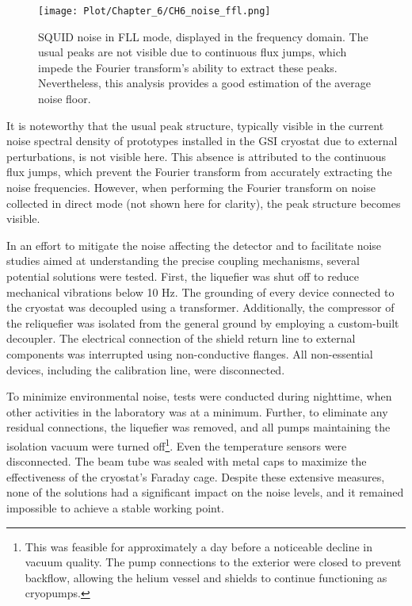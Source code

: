 \documentclass[12pt,a4paper]{report}
\begin{document}
	\begin{figure}[H]
		\centering
		\texttt{[image: Plot/Chapter\_6/CH6\_noise\_ffl.png]}
		\caption{\small{SQUID noise in FLL mode, displayed in the frequency domain. The usual peaks are not visible due to continuous flux jumps, which impede the Fourier transform's ability to extract these peaks. Nevertheless, this analysis provides a good estimation of the average noise floor.}}
		\label{CH6_noise_FLL} 
	\end{figure}
	
	It is noteworthy that the usual peak structure, typically visible in the current noise spectral density of prototypes installed in the GSI cryostat due to external perturbations, is not visible here. This absence is attributed to the continuous flux jumps, which prevent the Fourier transform from accurately extracting the noise frequencies. However, when performing the Fourier transform on noise collected in direct mode (not shown here for clarity), the peak structure becomes visible.
		
	In an effort to mitigate the noise affecting the detector and to facilitate noise studies aimed at understanding the precise coupling mechanisms, several potential solutions were tested. First, the liquefier was shut off to reduce mechanical vibrations below 10 Hz. The grounding of every device connected to the cryostat was decoupled using a transformer. Additionally, the compressor of the reliquefier was isolated from the general ground by employing a custom-built decoupler. The electrical connection of the shield return line to external components was interrupted using non-conductive flanges. All non-essential devices, including the calibration line, were disconnected.
	
	To minimize environmental noise, tests were conducted during nighttime, when other activities in the laboratory was at a minimum. Further, to eliminate any residual connections, the liquefier was removed, and all pumps maintaining the isolation vacuum were turned off\footnote{This was feasible for approximately a day before a noticeable decline in vacuum quality. The pump connections to the exterior were closed to prevent backflow, allowing the helium vessel and shields to continue functioning as cryopumps.}. Even the temperature sensors were disconnected. The beam tube was sealed with metal caps to maximize the effectiveness of the cryostat's Faraday cage. Despite these extensive measures, none of the solutions had a significant impact on the noise levels, and it remained impossible to achieve a stable working point.
	
\end{document}
